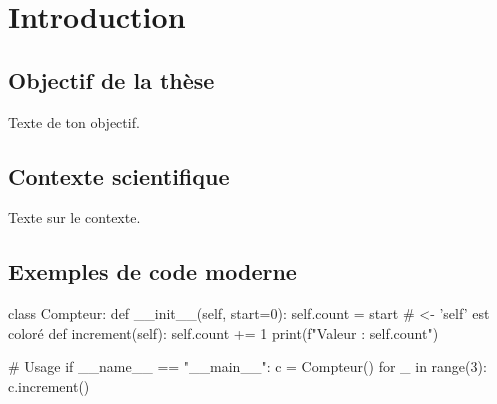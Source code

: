 \chapter{Introduction}
\newpage

\section{Objectif de la thèse}
Texte de ton objectif.

\section{Contexte scientifique}
Texte sur le contexte.

\section{Exemples de code moderne}

\begin{pythoncode}
class Compteur:
    def __init__(self, start=0):
        self.count = start        # <- 'self' est coloré
    def increment(self):
        self.count += 1
        print(f"Valeur : {self.count}")

# Usage
if __name__ == "__main__":
    c = Compteur()
    for _ in range(3):
        c.increment()
\end{pythoncode}
